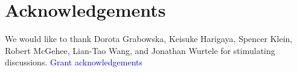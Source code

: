 \documentclass[twocolumn,showpacs,preprintnumbers,amsmath,amssymb,prd]{revtex4}
\begin{document}
\section*{Acknowledgements}
We would like to thank Dorota Grabowska, Keisuke Harigaya, Spencer Klein, Robert McGehee, Lian-Tao Wang, and Jonathan Wurtele for stimulating discussions.
\textcolor{blue}{Grant acknowledgements}


\end{document}

